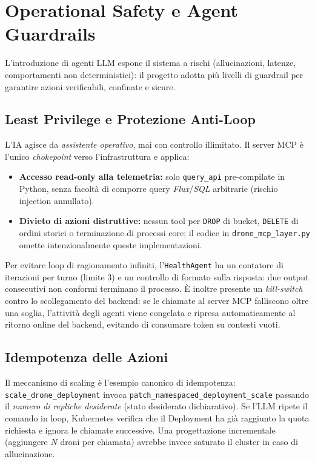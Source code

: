 
\chapter{Operational Safety e Agent Guardrails}
\label{cap:safety_guardrails}

L'introduzione di agenti LLM espone il sistema a rischi (allucinazioni, latenze, comportamenti non deterministici): il progetto adotta più livelli di guardrail per garantire azioni verificabili, confinate e sicure.

\section{Least Privilege e Protezione Anti-Loop}
\label{sec:least_privilege}

L'IA agisce da \emph{assistente operativo}, mai con controllo illimitato. Il server MCP è l'unico \textit{chokepoint} verso l'infrastruttura e applica:
\begin{itemize}
    \item \textbf{Accesso read-only alla telemetria:} solo \texttt{query\_api} pre-compilate in Python, senza facoltà di comporre query \textit{Flux}/\textit{SQL} arbitrarie (rischio injection annullato).
    \item \textbf{Divieto di azioni distruttive:} nessun tool per \texttt{DROP} di bucket, \texttt{DELETE} di ordini storici o terminazione di processi core; il codice in \texttt{drone\_mcp\_layer.py} omette intenzionalmente queste implementazioni.
\end{itemize}

Per evitare loop di ragionamento infiniti, l'\texttt{HealthAgent} ha un contatore di iterazioni per turno (limite 3) e un controllo di formato sulla risposta: due output consecutivi non conformi terminano il processo. È inoltre presente un \textit{kill-switch} contro lo scollegamento del backend: se le chiamate al server MCP falliscono oltre una soglia, l'attività degli agenti viene congelata e ripresa automaticamente al ritorno online del backend, evitando di consumare token su contesti vuoti.

\section{Idempotenza delle Azioni}
\label{sec:idempotenza_azioni}

Il meccanismo di scaling è l'esempio canonico di idempotenza: \texttt{scale\_drone\_deployment} invoca \texttt{patch\_namespaced\_deployment\_scale} passando il \emph{numero di repliche desiderate} (stato desiderato dichiarativo). Se l'LLM ripete il comando in loop, Kubernetes verifica che il Deployment ha già raggiunto la quota richiesta e ignora le chiamate successive. Una progettazione incrementale (aggiungere $N$ droni per chiamata) avrebbe invece saturato il cluster in caso di allucinazione.

